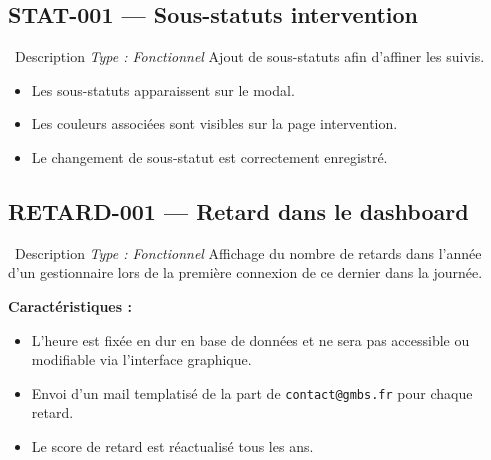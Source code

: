 \documentclass[12pt,a4paper]{article}
\newcommand{\checkmark}{\ding{51}}
\begin{document}
\subsection{STAT-001 — Sous-statuts intervention}
\label{subsec:stat-001}

\begin{featurebox}{\faTags\ Description \hfill \textit{Type : Fonctionnel}}
Ajout de sous-statuts afin d'affiner les suivis.
\end{featurebox}

\begin{testbox}
\begin{itemize}[leftmargin=2em, itemsep=2pt]
    \item[\checkmark] Les sous-statuts apparaissent sur le modal.
    \item[\checkmark] Les couleurs associées sont visibles sur la page intervention.
    \item[\checkmark] Le changement de sous-statut est correctement enregistré.
\end{itemize}
\end{testbox}

\subsection{RETARD-001 — Retard dans le dashboard}
\label{subsec:retard-001}

\begin{featurebox}{\faClock\ Description \hfill \textit{Type : Fonctionnel}}
Affichage du nombre de retards dans l'année d'un gestionnaire lors de la première connexion de ce dernier dans la journée.

\vspace{0.3cm}
\textbf{Caractéristiques :}
\begin{itemize}[leftmargin=2em, itemsep=0pt]
    \item L'heure est fixée en dur en base de données et ne sera pas accessible ou modifiable via l'interface graphique.
    \item Envoi d'un mail templatisé de la part de \texttt{contact@gmbs.fr} pour chaque retard.
    \item Le score de retard est réactualisé tous les ans.
\end{itemize}
\end{featurebox}
\end{document}
